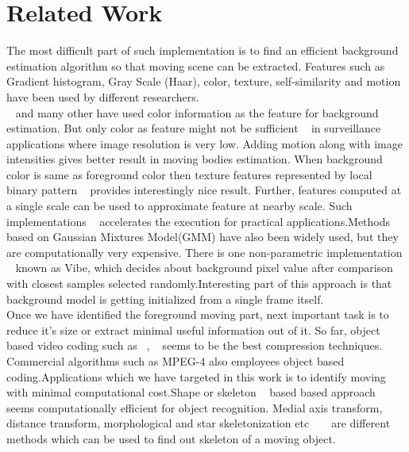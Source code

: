 \documentclass[conference]{IEEEtran}
\begin{document}
\section{Related Work}
The most difficult part of such implementation is to find an
efficient background estimation algorithm so that moving scene can be
extracted. Features such as Gradient histogram, Gray Scale (Haar),
color, texture, self-similarity and motion have been used by different
researchers. \\ \indent ~\cite{1} and many other have used color
information as the feature for background estimation. But only color as
feature might not be sufficient ~\cite{2} in surveillance applications
where image resolution is very low.  Adding motion along with image
intensities gives better result in moving bodies estimation. When
background color is same as foreground color then texture features
represented by local binary pattern ~\cite{3} provides interestingly
nice result. Further, features computed at a single scale can be used to
approximate feature at nearby scale. Such implementations ~\cite{4}
accelerates the execution for practical applications.Methods based on
Gaussian Mixtures Model(GMM) have also been widely used, but they are
computationally very expensive.  There is one non-parametric
implementation ~\cite{5} known as Vibe, which decides about background
pixel value after comparison with closest samples selected
randomly.Interesting part of this approach is that background model is
getting initialized from a single frame itself.\\ \indent Once we have
identified the foreground moving part, next important task is to reduce
it's size or extract minimal useful information out of it. So far,
object based video coding such as ~\cite{7}, ~\cite{8} seems to be the
best compression techniques.  Commercial algorithms such as MPEG-4 also
employees object based coding.Applications which we have targeted in
this work is to identify moving with minimal computational cost.Shape or
skeleton ~\cite{11} based based approach seems computationally efficient
for object recognition.  Medial axis transform, distance transform,
morphological and star skeletonization etc ~\cite{9} ~\cite{10} are
different methods which can be used to find out skeleton of a moving
object.\\
\end{document}
